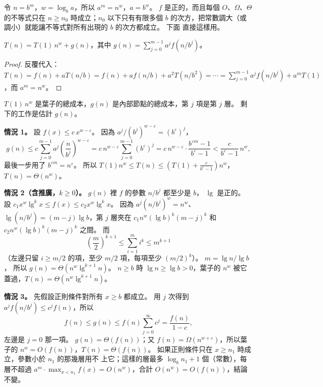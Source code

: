 \begin{whybox}
令 $n = b^m$，$w = \log_b a$，所以 $a^m = n^w$，$a = b^w$。 $f$ 是正的，而且每個
$O$、$\Omega$、$\Theta$ 的不等式只在 $n \ge n_0$ 時成立；$n_0$ 以下只有有限多個
$b$ 的次方，把常數調大（或調小）就能讓不等式對所有出現的 $b$ 的次方都成立。 下面
直接這樣用。

\begin{lemma}
\label{lem:rec-unroll}
$T(n) = T(1)\, n^{w} + g(n)$，其中 $g(n) = \sum_{j=0}^{m-1} a^j f(n/b^j)$。
\end{lemma}

\begin{proof}
反覆代入：$T(n) = f(n) + aT(n/b) = f(n) + af(n/b) + a^2 T(n/b^2) = \cdots =
\sum_{j=0}^{m-1} a^j f(n/b^j) + a^m T(1)$，而 $a^m = n^w$。
\end{proof}

$T(1)\, n^w$ 是葉子的總成本，$g(n)$ 是內部節點的總成本，第 $j$ 項是第 $j$ 層。 剩
下的工作是估計 $g(n)$。

\textbf{情況 1。} 設 $f(x) \le c\, x^{w - \varepsilon}$。 因為
$a^j / (b^j)^{w - \varepsilon} = (b^{\varepsilon})^j$，
\[
g(n) \le c \sum_{j=0}^{m-1} a^j \left(\frac{n}{b^j}\right)^{w - \varepsilon}
= c\, n^{w - \varepsilon} \sum_{j=0}^{m-1} (b^{\varepsilon})^j
= c\, n^{w - \varepsilon} \cdot \frac{b^{\varepsilon m} - 1}{b^{\varepsilon} - 1}
< \frac{c}{b^{\varepsilon} - 1}\, n^{w},
\]
最後一步用了 $b^{\varepsilon m} = n^{\varepsilon}$。 所以
$T(1) n^w \le T(n) \le (T(1) + \frac{c}{b^\varepsilon - 1}) n^w$，$T(n) = \Theta(n^w)$。

\textbf{情況 2（含推廣，$k \ge 0$）。} $g(n)$ 裡 $f$ 的參數 $n/b^j$ 都至少是 $b$，
$\lg$ 是正的。 設 $c_1 x^w \lg^k x \le f(x) \le c_2 x^w \lg^k x$。 因為
$a^j (n/b^j)^w = n^w$、$\lg(n/b^j) = (m - j)\lg b$，第 $j$ 層夾在
$c_1 n^w (\lg b)^k (m-j)^k$ 和 $c_2 n^w (\lg b)^k (m-j)^k$ 之間。 而
\[
\left(\frac{m}{2}\right)^{k+1} \le \sum_{i=1}^{m} i^k \le m^{k+1}
\]
（左邊只留 $i \ge m/2$ 的項，至少 $m/2$ 項，每項至少 $(m/2)^k$）。 $m = \lg n / \lg b$，
所以 $g(n) = \Theta(n^w \lg^{k+1} n)$。 $n \ge b$ 時 $\lg n \ge \lg b > 0$，葉子的
$n^w$ 被它蓋過，$T(n) = \Theta(n^w \lg^{k+1} n)$。

\textbf{情況 3。} 先假設正則條件對所有 $x \ge b$ 都成立。 用 $j$ 次得到
$a^j f(n/b^j) \le c^j f(n)$，所以
\[
f(n) \le g(n) \le f(n) \sum_{j=0}^{\infty} c^j = \frac{f(n)}{1 - c},
\]
左邊是 $j = 0$ 那一項。 $g(n) = \Theta(f(n))$；又
$f(n) = \Omega(n^{w + \varepsilon})$，所以葉子的 $n^w = O(f(n))$，$T(n) =
\Theta(f(n))$。 如果正則條件只在 $x \ge n_1$ 時成立，參數小於 $n_1$ 的那幾層用不
上它；這樣的層最多 $\log_b n_1 + 1$ 個（常數），每層不超過
$a^m \cdot \max_{x < n_1} f(x) = O(n^w)$，合計 $O(n^w) = O(f(n))$，結論不變。
\end{whybox}

